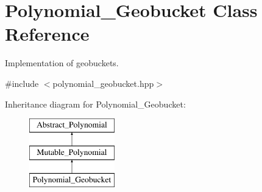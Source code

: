 \hypertarget{class_polynomial___geobucket}{}\section{Polynomial\+\_\+\+Geobucket Class Reference}
\label{class_polynomial___geobucket}


Implementation of geobuckets.  




{\ttfamily \#include $<$polynomial\+\_\+geobucket.\+hpp$>$}

Inheritance diagram for Polynomial\+\_\+\+Geobucket\+:\begin{figure}[H]
\begin{center}
\leavevmode
\includegraphics[height=3.000000cm]{class_polynomial___geobucket}
\end{center}
\end{figure}
